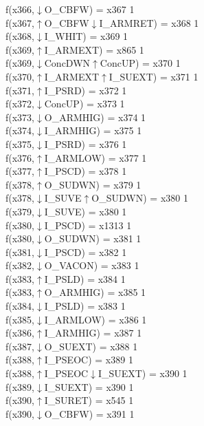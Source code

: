 f(x366,$\downarrow$O\_CBFW) = x367 {1} \\
f(x367,$\uparrow$O\_CBFW$\downarrow$I\_ARMRET) = x368 {1} \\
f(x368,$\downarrow$I\_WHIT) = x369 {1} \\
f(x369,$\uparrow$I\_ARMEXT) = x865 {1} \\
f(x369,$\downarrow$ConcDWN$\uparrow$ConcUP) = x370 {1} \\
f(x370,$\uparrow$I\_ARMEXT$\uparrow$I\_SUEXT) = x371 {1} \\
f(x371,$\uparrow$I\_PSRD) = x372 {1} \\
f(x372,$\downarrow$ConcUP) = x373 {1} \\
f(x373,$\downarrow$O\_ARMHIG) = x374 {1} \\
f(x374,$\downarrow$I\_ARMHIG) = x375 {1} \\
f(x375,$\downarrow$I\_PSRD) = x376 {1} \\
f(x376,$\uparrow$I\_ARMLOW) = x377 {1} \\
f(x377,$\uparrow$I\_PSCD) = x378 {1} \\
f(x378,$\uparrow$O\_SUDWN) = x379 {1} \\
f(x378,$\downarrow$I\_SUVE$\uparrow$O\_SUDWN) = x380 {1} \\
f(x379,$\downarrow$I\_SUVE) = x380 {1} \\
f(x380,$\downarrow$I\_PSCD) = x1313 {1} \\
f(x380,$\downarrow$O\_SUDWN) = x381 {1} \\
f(x381,$\downarrow$I\_PSCD) = x382 {1} \\
f(x382,$\downarrow$O\_VACON) = x383 {1} \\
f(x383,$\uparrow$I\_PSLD) = x384 {1} \\
f(x383,$\uparrow$O\_ARMHIG) = x385 {1} \\
f(x384,$\downarrow$I\_PSLD) = x383 {1} \\
f(x385,$\downarrow$I\_ARMLOW) = x386 {1} \\
f(x386,$\uparrow$I\_ARMHIG) = x387 {1} \\
f(x387,$\downarrow$O\_SUEXT) = x388 {1} \\
f(x388,$\uparrow$I\_PSEOC) = x389 {1} \\
f(x388,$\uparrow$I\_PSEOC$\downarrow$I\_SUEXT) = x390 {1} \\
f(x389,$\downarrow$I\_SUEXT) = x390 {1} \\
f(x390,$\uparrow$I\_SURET) = x545 {1} \\
f(x390,$\downarrow$O\_CBFW) = x391 {1} \\
